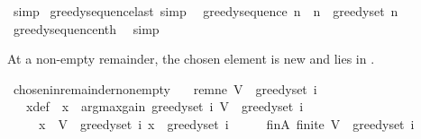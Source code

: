 \begin{isabellebody}
\ simp%
\endisatagproof
{\isafoldproof}%
%
\isadelimproof
\isanewline
%
\endisadelimproof
\isanewline
{}\isamarkupfalse%
\ greedy{\isacharunderscore}{\kern0pt}sequence{\isacharunderscore}{\kern0pt}last\ {\isacharbrackleft}{\kern0pt}simp{\isacharbrackright}{\kern0pt}{\isacharcolon}{\kern0pt}\isanewline
\ \ {\isachardoublequoteopen}greedy{\isacharunderscore}{\kern0pt}sequence\ n\ {\isacharbang}{\kern0pt}\ n\ {\isacharequal}{\kern0pt}\ greedy{\isacharunderscore}{\kern0pt}set\ n{\isachardoublequoteclose}\isanewline
%
\isadelimproof
\ \ %
\endisadelimproof
%
\isatagproof
{}\isamarkupfalse%
\ greedy{\isacharunderscore}{\kern0pt}sequence{\isacharunderscore}{\kern0pt}nth\ \isamarkupfalse%
\ simp%
\endisatagproof
{\isafoldproof}%
%
\isadelimproof
%
\endisadelimproof
%
\begin{isamarkuptext}%
At a non-empty remainder, the chosen element is new and lies in .%
\end{isamarkuptext}\isamarkuptrue%
\isamarkupfalse%
\ chosen{\isacharunderscore}{\kern0pt}in{\isacharunderscore}{\kern0pt}remainder{\isacharunderscore}{\kern0pt}nonempty{\isacharcolon}{\kern0pt}\isanewline
\ \ \ rem{\isacharunderscore}{\kern0pt}ne{\isacharcolon}{\kern0pt}\ {\isachardoublequoteopen}V\ {\isacharminus}{\kern0pt}\ greedy{\isacharunderscore}{\kern0pt}set\ i\ {\isasymnoteq}\ {\isacharbraceleft}{\kern0pt}{\isacharbraceright}{\kern0pt}{\isachardoublequoteclose}\isanewline
\ \ \ x{\isacharunderscore}{\kern0pt}def{\isacharcolon}{\kern0pt}\ \ {\isachardoublequoteopen}x\ {\isasymequiv}\ argmax{\isacharunderscore}{\kern0pt}gain\ {\isacharparenleft}{\kern0pt}greedy{\isacharunderscore}{\kern0pt}set\ i{\isacharparenright}{\kern0pt}\ {\isacharparenleft}{\kern0pt}V\ {\isacharminus}{\kern0pt}\ greedy{\isacharunderscore}{\kern0pt}set\ i{\isacharparenright}{\kern0pt}{\isachardoublequoteclose}\isanewline
\ \ \ \ \ {\isachardoublequoteopen}x\ {\isasymin}\ V\ {\isacharminus}{\kern0pt}\ greedy{\isacharunderscore}{\kern0pt}set\ i{\isachardoublequoteclose}\ {\isachardoublequoteopen}x\ {\isasymnotin}\ greedy{\isacharunderscore}{\kern0pt}set\ i{\isachardoublequoteclose}\isanewline
%
\isadelimproof
%
\endisadelimproof
%
\isatagproof
{}\isamarkupfalse%
\ {\isacharminus}{\kern0pt}\isanewline
\ \ \isamarkupfalse%
\ finA{\isacharcolon}{\kern0pt}\ {\isachardoublequoteopen}finite\ {\isacharparenleft}{\kern0pt}V\ {\isacharminus}{\kern0pt}\ greedy{\isacharunderscore}{\kern0pt}set\ i{\isacharparenright}{\kern0pt}{\isachardoublequoteclose}\isanewline

\end{isabellebody}
